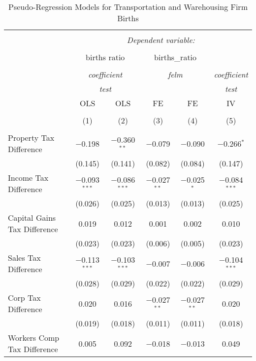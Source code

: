 
\begin{table}[!htbp] \centering 
  \caption{Pseudo-Regression Models for  Transportation and Warehousing Firm Births} 
  \label{} 
\begin{tabular}{@{\extracolsep{5pt}}lccccc} 
\\[-1.8ex]\hline 
\hline \\[-1.8ex] 
 & \multicolumn{5}{c}{\textit{Dependent variable:}} \\ 
\cline{2-6} 
\\[-1.8ex] & \multicolumn{2}{c}{births ratio} & \multicolumn{2}{c}{births\_ratio} &   \\ 
\\[-1.8ex] & \multicolumn{2}{c}{\textit{coefficient}} & \multicolumn{2}{c}{\textit{felm}} & \textit{coefficient} \\ 
 & \multicolumn{2}{c}{\textit{test}} & \multicolumn{2}{c}{\textit{}} & \textit{test} \\ 
 & OLS & OLS & FE & FE & IV \\ 
\\[-1.8ex] & (1) & (2) & (3) & (4) & (5)\\ 
\hline \\[-1.8ex] 
 Property Tax Difference & $-$0.198 & $-$0.360$^{**}$ & $-$0.079 & $-$0.090 & $-$0.266$^{*}$ \\ 
  & (0.145) & (0.141) & (0.082) & (0.084) & (0.147) \\ 
  Income Tax Difference & $-$0.093$^{***}$ & $-$0.086$^{***}$ & $-$0.027$^{**}$ & $-$0.025$^{*}$ & $-$0.084$^{***}$ \\ 
  & (0.026) & (0.025) & (0.013) & (0.013) & (0.025) \\ 
  Capital Gains Tax Difference & 0.019 & 0.012 & 0.001 & 0.002 & 0.010 \\ 
  & (0.023) & (0.023) & (0.006) & (0.005) & (0.023) \\ 
  Sales Tax Difference & $-$0.113$^{***}$ & $-$0.103$^{***}$ & $-$0.007 & $-$0.006 & $-$0.104$^{***}$ \\ 
  & (0.028) & (0.029) & (0.022) & (0.022) & (0.029) \\ 
  Corp Tax Difference & 0.020 & 0.016 & $-$0.027$^{**}$ & $-$0.027$^{**}$ & 0.020 \\ 
  & (0.019) & (0.018) & (0.011) & (0.011) & (0.018) \\ 
  Workers Comp Tax Difference & 0.005 & 0.092 & $-$0.018 & $-$0.013 & 0.049 \\ 

\end{tabular}
\end{table}
